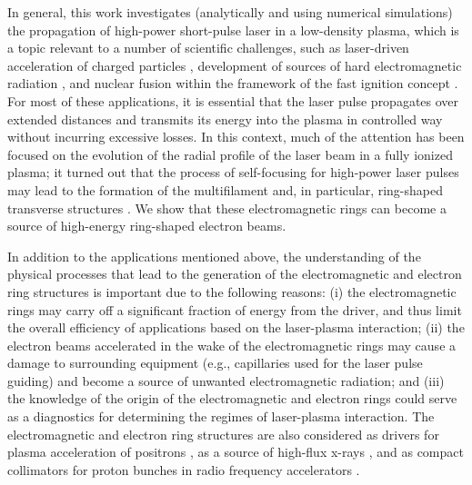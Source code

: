 \documentclass[10pt, a4paper, twoside, openright]{report}
\begin{document}
In general, this work investigates (analytically and using numerical simulations) the propagation of high-power short-pulse laser in a low-density plasma, which is a topic relevant to a number of scientific challenges, such as laser-driven acceleration of charged particles \cite{Tajima1979, Esarey2009, Gonsalves2019}, development of sources of hard electromagnetic radiation \cite{Pirozhkov2012, Bulanov2013}, and nuclear fusion within the framework of the fast ignition concept \cite{Tabak1994}. For most of these applications, it is essential that the laser pulse propagates over extended distances and transmits its energy into the plasma in controlled way without incurring excessive losses. In this context, much of the attention has been focused on the evolution of the radial profile of the laser beam in a fully ionized plasma; it turned out that the process of self-focusing for high-power laser pulses may lead to the formation of the multifilament and, in particular, ring-shaped transverse structures \cite{Mori1988, Cohen1991, Borisov1992, Krushelnick1997, Cattani2001, Kim2002, Naseri2016, Kovalev2019}. We show that these electromagnetic rings can become a source of high-energy ring-shaped electron beams. 

In addition to the applications mentioned above, the understanding of the physical processes that lead to the generation of the electromagnetic and electron ring structures is important due to the following reasons: (i) the electromagnetic rings may carry off a significant fraction of energy from the driver, and thus limit the overall efficiency of applications based on the laser-plasma interaction; (ii) the electron beams accelerated in the wake of the electromagnetic rings may cause a damage to surrounding equipment (e.g., capillaries used for the laser pulse guiding) and become a source of unwanted electromagnetic radiation; and (iii) the knowledge of the origin of the electromagnetic and electron rings could serve as a diagnostics for determining the regimes of laser-plasma interaction. The electromagnetic and electron ring structures are also considered as drivers for plasma acceleration of positrons \cite{Jain2015, Jain2019}, as a source of high-flux x-rays \cite{Zhao2016}, and as compact collimators for proton bunches in radio frequency accelerators \cite{Stancari2011}.
\end{document}
